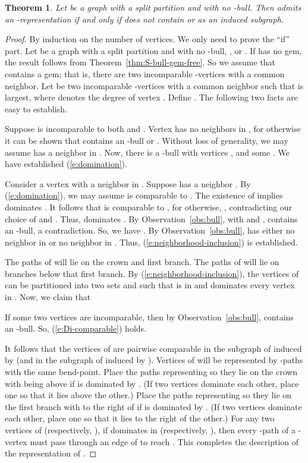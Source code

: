\documentclass[11pt,3p,times]{elsarticle}
\newenvironment{myproof}{\begin{proof}}{\end{proof}}
\newtheorem{theorem}{Theorem}
\begin{document}
\begin{theorem}\label{thm:bull-free}
Let  be a graph with a split partition  and with no
-bull. Then  admits an -representation if and only if  does
not contain  or  as an induced subgraph.
\end{theorem}
\begin{myproof}
By induction on the number of vertices. We
only need to prove the ``if'' part. Let  be a graph with a
split partition  and with no -bull, , or .
If  has no gem, the result follows from Theorem~\ref{thm:S-bull-gem-free}.
So we assume that  contains a gem; that is,
there are two incomparable -vertices with a common
neighbor. Let  be two incomparable -vertices with a
common neighbor such that  is largest, where
 denotes the degree of vertex . Define .
The following two facts are easy to establish.

Suppose  is incomparable
to both  and . Vertex  has no neighbors in , for otherwise it can be shown that  contains
an -bull or . Without loss of generality, we may assume
 has a neighbor  in . Now, there is a
-bull with vertices , and some . We have established (\ref{e:domination}).



Consider a vertex
 with a neighbor in . Suppose  has a neighbor
. By (\ref{e:domination}), we may assume  is
comparable to . The existence of  implies  dominates
. It follows that  is comparable to , for
otherwise, , contradicting our choice of  and .
Thus,  dominates . By Observation~\ref{obs:bull}, with
 and ,  contains an -bull, a
contradiction. So, we have . By
Observation~\ref{obs:bull},  has either no neighbor in  or no neighbor in . Thus,
(\ref{e:neighborhood-inclusion}) is established.

The paths of  will lie on the
crown and first branch. The paths of  will lie on
branches below that first branch. By
(\ref{e:neighborhood-inclusion}), the vertices of  
can be partitioned into two sets  and  such that 
is in  and dominates every vertex in . Now, we
claim that

If some two vertices  are incomparable, then by
Observation~\ref{obs:bull},  contains an -bull. So,
(\ref{e:Di-comparable}) holds.

It follows that the vertices of
 are pairwise comparable in the subgraph of  induced by
  (and in the subgraph of  induced by ).
Vertices of  will be
represented by -paths with the same bend-point. Place the
paths representing  so they lie on the crown with  being above 
if  is dominated by . (If two vertices dominate each other,
place one so that it lies above the other.) Place the paths representing 
so they lie on
the first branch with  to the right of  if  is
dominated by . (If two vertices dominate each other,
place one so that it lies to the right of the other.) For any two vertices  of  (respectively,
), if  dominates  in (respectively, ), then every
-path of a -vertex must pass through an edge of  to
reach . This completes the description of the representation
of .




\end{myproof}
\end{document}
